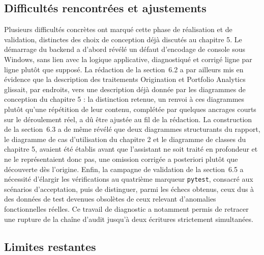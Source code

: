\subsection{Difficultés rencontrées et ajustements}

Plusieurs difficultés concrètes ont marqué cette phase de réalisation et de validation, distinctes des choix de conception déjà discutés au chapitre 5. Le démarrage du backend a d'abord révélé un défaut d'encodage de console sous Windows, sans lien avec la logique applicative, diagnostiqué et corrigé ligne par ligne plutôt que supposé. La rédaction de la section~6.2 a par ailleurs mis en évidence que la description des traitements Origination et Portfolio Analytics glissait, par endroits, vers une description déjà donnée par les diagrammes de conception du chapitre 5 : la distinction retenue, un renvoi à ces diagrammes plutôt qu'une répétition de leur contenu, complétée par quelques ancrages courts sur le déroulement réel, a dû être ajustée au fil de la rédaction. La construction de la section~6.3 a de même révélé que deux diagrammes structurants du rapport, le diagramme de cas d'utilisation du chapitre 2 et le diagramme de classes du chapitre 5, avaient été établis avant que l'assistant ne soit traité en profondeur et ne le représentaient donc pas, une omission corrigée a posteriori plutôt que découverte dès l'origine. Enfin, la campagne de validation de la section~6.5 a nécessité d'élargir les vérifications au quatrième marqueur \texttt{pytest}, consacré aux scénarios d'acceptation, puis de distinguer, parmi les échecs obtenus, ceux dus à des données de test devenues obsolètes de ceux relevant d'anomalies fonctionnelles réelles. Ce travail de diagnostic a notamment permis de retracer une rupture de la chaîne d'audit jusqu'à deux écritures strictement simultanées.

\subsection{Limites restantes}

